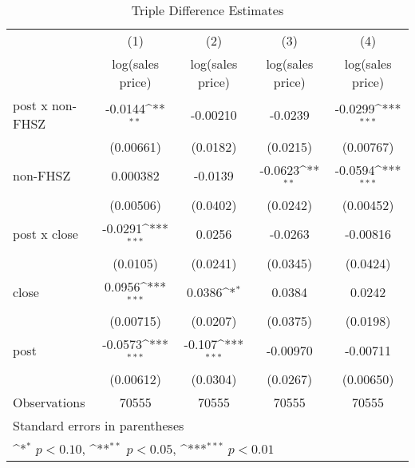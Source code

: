 \begin{table}[htbp]\centering
\def\sym#1{\ifmmode^{#1}\else\(^{#1}\)\fi}
\caption{Triple Difference Estimates\label{tabl}}
\begin{tabular}{l*{4}{c}}
\hline\hline
                    &\multicolumn{1}{c}{(1)}&\multicolumn{1}{c}{(2)}&\multicolumn{1}{c}{(3)}&\multicolumn{1}{c}{(4)}\\
                    &\multicolumn{1}{c}{log(sales price)}&\multicolumn{1}{c}{log(sales price)}&\multicolumn{1}{c}{log(sales price)}&\multicolumn{1}{c}{log(sales price)}\\
\hline
post x non-FHSZ     &     -0.0144\sym{**} &    -0.00210         &     -0.0239         &     -0.0299\sym{***}\\
                    &   (0.00661)         &    (0.0182)         &    (0.0215)         &   (0.00767)         \\
[1em]
non-FHSZ            &    0.000382         &     -0.0139         &     -0.0623\sym{**} &     -0.0594\sym{***}\\
                    &   (0.00506)         &    (0.0402)         &    (0.0242)         &   (0.00452)         \\
[1em]
post x close        &     -0.0291\sym{***}&      0.0256         &     -0.0263         &    -0.00816         \\
                    &    (0.0105)         &    (0.0241)         &    (0.0345)         &    (0.0424)         \\
[1em]
close               &      0.0956\sym{***}&      0.0386\sym{*}  &      0.0384         &      0.0242         \\
                    &   (0.00715)         &    (0.0207)         &    (0.0375)         &    (0.0198)         \\
[1em]
post                &     -0.0573\sym{***}&      -0.107\sym{***}&    -0.00970         &    -0.00711         \\
                    &   (0.00612)         &    (0.0304)         &    (0.0267)         &   (0.00650)         \\
\hline
Observations        &       70555         &       70555         &       70555         &       70555         \\
\hline\hline
\multicolumn{5}{l}{\footnotesize Standard errors in parentheses}\\
\multicolumn{5}{l}{\footnotesize \sym{*} \(p<0.10\), \sym{**} \(p<0.05\), \sym{***} \(p<0.01\)}\\
\end{tabular}
\end{table}
